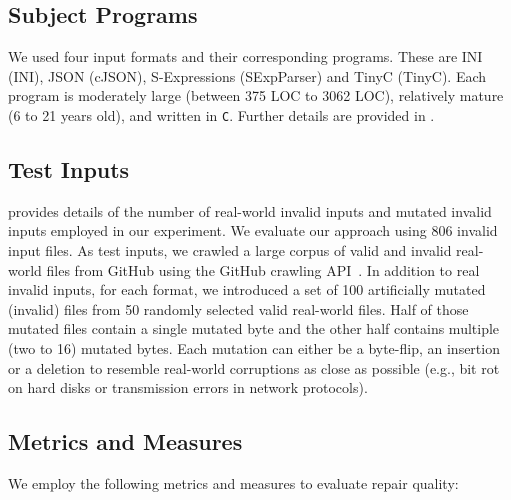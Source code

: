 \documentclass[acmsmall,screen,review,anonymous]{acmart}
\def\<#1>{\texttt{#1}}
\begin{document}
\subsection{Subject Programs} %
We used four input formats and their corresponding programs. These are INI (INI), JSON (cJSON), S-Expressions (SExpParser) and TinyC (TinyC). Each program is moderately large (between 375 LOC to 3062 LOC), relatively mature (6 to 21 years old), and written in \<C>. Further details are provided in .

\subsection{Test Inputs} 
 provides details of the number of
real-world invalid inputs and mutated invalid inputs employed in our experiment.
We evaluate our approach using 806 invalid input files. %
As test inputs, we crawled a large corpus of valid and invalid real-world files
from GitHub using the GitHub crawling API~\cite{githubapi}. 
In addition to real invalid inputs, for each format, we introduced a set of 100 artificially mutated (invalid) files
from 50 randomly selected valid real-world files.
Half of those mutated files contain a single mutated byte and the other half
contains multiple (two to 16) mutated bytes.
Each mutation can either be a byte-flip, an insertion or a deletion to 
resemble real-world corruptions as close as possible
(e.g., bit rot on hard disks or transmission errors in network protocols).


\subsection{Metrics and Measures} We employ the following metrics and measures to evaluate repair quality: 
\end{document}

